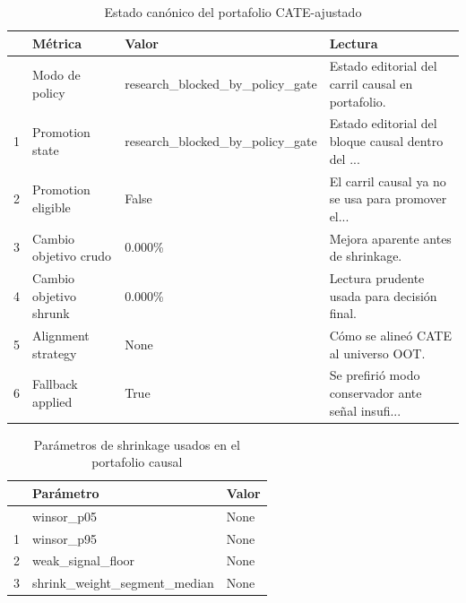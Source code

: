 \documentclass[
  spanish,
  11pt,
  letterpaper,
]{scrbook}
\theoremstyle{plain}
\theoremstyle{remark}
\begin{document}
{

\begin{longtable}[]{@{}llll@{}}

\caption{\label{tbl-cate-portfolio-status}Estado canónico del portafolio
CATE-ajustado}

\tabularnewline

\toprule\noalign{}
& Métrica & Valor & Lectura \\
\midrule\noalign{}
\endhead
\bottomrule\noalign{}
\endlastfoot
0 & Modo de policy & research\_blocked\_by\_policy\_gate & Estado
editorial del carril causal en portafolio. \\
1 & Promotion state & research\_blocked\_by\_policy\_gate & Estado
editorial del bloque causal dentro del ... \\
2 & Promotion eligible & False & El carril causal ya no se usa para
promover el... \\
3 & Cambio objetivo crudo & 0.000\% & Mejora aparente antes de
shrinkage. \\
4 & Cambio objetivo shrunk & 0.000\% & Lectura prudente usada para
decisión final. \\
5 & Alignment strategy & None & Cómo se alineó CATE al universo OOT. \\
6 & Fallback applied & True & Se prefirió modo conservador ante señal
insufi... \\

\end{longtable}

}

{

\begin{longtable}[]{@{}lll@{}}

\caption{\label{tbl-cate-shrinkage-policy}Parámetros de shrinkage usados
en el portafolio causal}

\tabularnewline

\toprule\noalign{}
& Parámetro & Valor \\
\midrule\noalign{}
\endhead
\bottomrule\noalign{}
\endlastfoot
0 & winsor\_p05 & None \\
1 & winsor\_p95 & None \\
2 & weak\_signal\_floor & None \\
3 & shrink\_weight\_segment\_median & None \\

\end{longtable}

}
\end{document}
